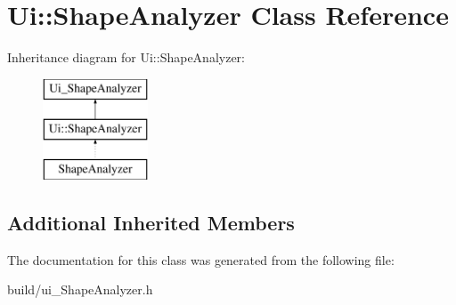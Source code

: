 \hypertarget{class_ui_1_1_shape_analyzer}{}\section{Ui\+:\+:Shape\+Analyzer Class Reference}
\label{class_ui_1_1_shape_analyzer}
Inheritance diagram for Ui\+:\+:Shape\+Analyzer\+:\begin{figure}[H]
\begin{center}
\leavevmode
\includegraphics[height=3.000000cm]{class_ui_1_1_shape_analyzer}
\end{center}
\end{figure}
\subsection*{Additional Inherited Members}


The documentation for this class was generated from the following file\+:\begin{DoxyCompactItemize}
\item 
build/ui\+\_\+\+Shape\+Analyzer.\+h\end{DoxyCompactItemize}
